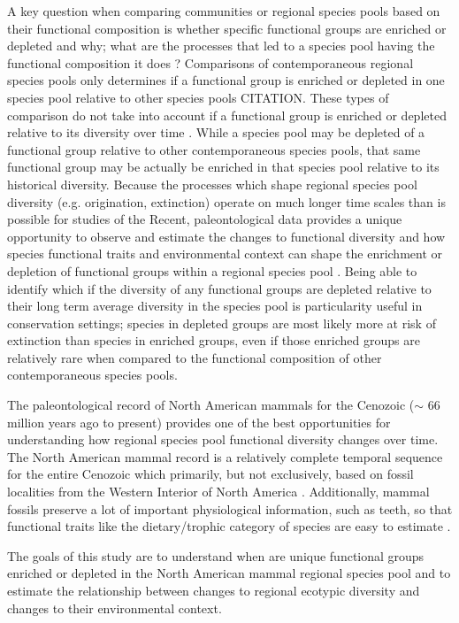 \documentclass[12pt,letterpaper]{article}
\begin{document}
A key question when comparing communities or regional species pools based on their functional composition is whether specific functional groups are enriched or depleted and why; what are the processes that led to a species pool having the functional composition it does \citep{Mcgill2006,Weber2017,Brown1989,Smith2008b,Blois2009}? Comparisons of contemporaneous regional species pools only determines if a functional group is enriched or depleted in one species pool relative to other species pools CITATION. These types of comparison do not take into account if a functional group is enriched or depleted relative to its diversity over time \citep{Blois2009}. While a species pool may be depleted of a functional group relative to other contemporaneous species pools, that same functional group may be actually be enriched in that species pool relative to its historical diversity. Because the processes which shape regional species pool diversity (e.g. origination, extinction) operate on much longer time scales than is possible for studies of the Recent, paleontological data provides a unique opportunity to observe and estimate the changes to functional diversity and how species functional traits and environmental context can shape the enrichment or depletion of functional groups within a regional species pool \citep{Blois2009,Smith2008b}. Being able to identify which if the diversity of any functional groups are depleted relative to their long term average diversity in the species pool is particularity useful in conservation settings; species in depleted groups are most likely more at risk of extinction than species in enriched groups, even if those enriched groups are relatively rare when compared to the functional composition of other contemporaneous species pools.

The paleontological record of North American mammals for the Cenozoic (\(\sim\) 66 million years ago to present) provides one of the best opportunities for understanding how regional species pool functional diversity changes over time. The North American mammal record is a relatively complete temporal sequence for the entire Cenozoic which primarily, but not exclusively, based on fossil localities from the Western Interior of North America \citep{Alroy1996a,Alroy2000g,Alroy2009}. Additionally, mammal fossils preserve a lot of important physiological information, such as teeth, so that functional traits like the dietary/trophic category of species are easy to estimate \citep{Polly2015a,Polly2011b,Eronen2010a}.

The goals of this study are to understand when are unique functional groups enriched or depleted in the North American mammal regional species pool and to estimate the relationship between changes to regional ecotypic diversity and changes to their environmental context.
\end{document}
